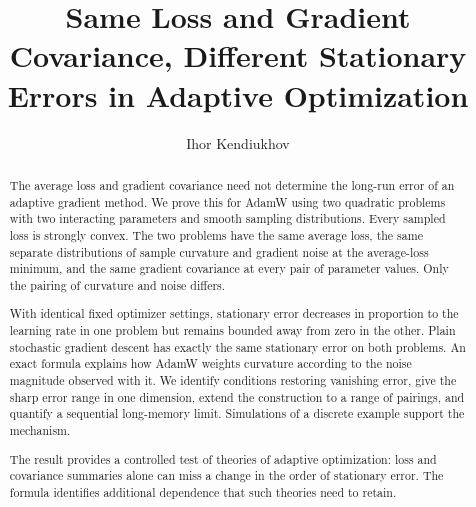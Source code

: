 \title{Same Loss and Gradient Covariance, Different Stationary Errors in Adaptive Optimization}
\author{Ihor Kendiukhov}
\date{}
\maketitle
\begin{abstract}
The average loss and gradient covariance need not determine the long-run
error of an adaptive gradient method. We prove this for AdamW using two
quadratic problems with two interacting parameters and smooth sampling
distributions. Every sampled loss is strongly convex. The two problems
have the same average loss, the same separate distributions of sample
curvature and gradient noise at the average-loss minimum, and the same
gradient covariance at every pair of parameter values. Only the pairing
of curvature and noise differs.

With identical fixed optimizer settings, stationary error decreases in
proportion to the learning rate in one problem but remains bounded away
from zero in the other. Plain stochastic gradient descent has exactly
the same stationary error on both problems. An exact formula explains
how AdamW weights curvature according to the noise magnitude observed
with it. We identify conditions restoring vanishing error, give the
sharp error range in one dimension, extend the construction to a range
of pairings, and quantify a sequential long-memory limit. Simulations of
a discrete example support the mechanism.

The result provides a controlled test of theories of adaptive optimization:
loss and covariance summaries alone can miss a change in the order of
stationary error. The formula identifies additional dependence that such
theories need to retain.
\end{abstract}

